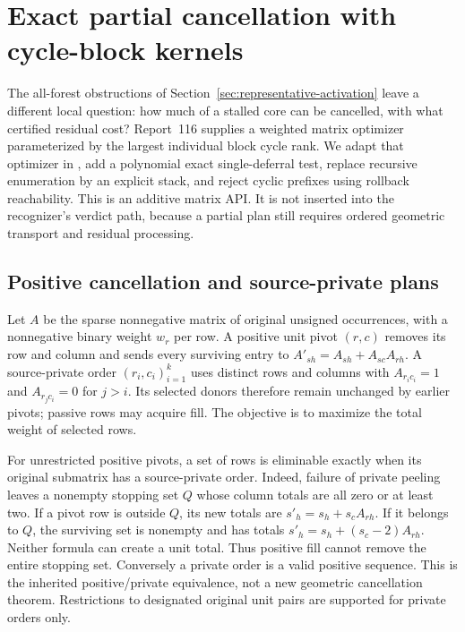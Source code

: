 \section{Exact partial cancellation with cycle-block kernels}
\label{sec:cycle-block-cancellation}

The all-forest obstructions of Section~\ref{sec:representative-activation}
leave a different local question: how much of a stalled core can be
cancelled, with what certified residual cost?  Report~116 supplies a
weighted matrix optimizer parameterized by the largest individual block
cycle rank.  We adapt that optimizer in
, add a polynomial exact
single-deferral test, replace recursive enumeration by an explicit stack,
and reject cyclic prefixes using rollback reachability.  This is an
additive matrix API.  It is not inserted into the recognizer's verdict
path, because a partial plan still requires ordered geometric transport
and residual processing.

\subsection{Positive cancellation and source-private plans}

Let $A$ be the sparse nonnegative matrix of original unsigned occurrences,
with a nonnegative binary weight $w_r$ per row.  A positive unit pivot
$(r,c)$ removes its row and column and sends every surviving entry to
$A'_{sh}=A_{sh}+A_{sc}A_{rh}$.  A source-private order
$(r_i,c_i)_{i=1}^k$ uses distinct rows and columns with
$A_{r_i c_i}=1$ and $A_{r_j c_i}=0$ for $j>i$.  Its selected donors
therefore remain unchanged by earlier pivots; passive rows may acquire
fill.  The objective is to maximize the total weight of selected rows.

For unrestricted positive pivots, a set of rows is eliminable exactly
when its original submatrix has a source-private order.  Indeed, failure
of private peeling leaves a nonempty stopping set $Q$ whose column
totals are all zero or at least two.  If a pivot row is outside $Q$, its
new totals are $s'_h=s_h+s_c A_{rh}$.  If it belongs to $Q$, the surviving
set is nonempty and has totals $s'_h=s_h+(s_c-2)A_{rh}$.  Neither formula
can create a unit total.  Thus positive fill cannot remove the entire
stopping set.  Conversely a private order is a valid positive sequence.
This is the inherited positive/private equivalence, not a new geometric
cancellation theorem.  Restrictions to designated original unit pairs
are supported for private orders only.

